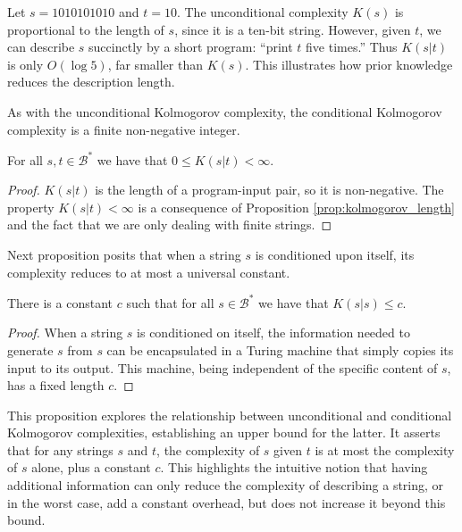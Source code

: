 \begin{example}
Let $s = 1010101010$ and $t = 10$. The unconditional complexity $K(s)$ is proportional to the length of $s$, since it is a ten-bit string. However, given $t$, we can describe $s$ succinctly by a short program: ``print $t$ five times.'' Thus $K(s|t)$ is only $O(\log 5)$, far smaller than $K(s)$. This illustrates how prior knowledge reduces the description length.
\end{example}

As with the unconditional Kolmogorov complexity, the conditional Kolmogorov complexity is a finite non-negative integer.

\begin{proposition}
For all $s, t \in\mathcal{B}^{\ast}$ we have that $0 \leq K(s | t) < \infty$.
\end{proposition}
\begin{proof}
$K(s|t)$ is the length of a program-input pair, so it is non-negative. The property $K(s | t) < \infty$ is a consequence of Proposition \ref{prop:kolmogorov_length} and the fact that we are only dealing with finite strings.
\end{proof}

Next proposition posits that when a string $s$ is conditioned upon itself, its complexity reduces to at most a universal constant.

\begin{proposition}
\label{prop:self_conditional}
There is a constant $c$ such that for all $s\in\mathcal{B}^{\ast}$ we have that $K(s | s ) \leq c$.
\end{proposition}
\begin{proof}
When a string $s$ is conditioned on itself, the information needed to generate $s$ from $s$ can be encapsulated in a Turing machine that simply copies its input to its output. This machine, being independent of the specific content of $s$, has a fixed length $c$. 
\end{proof}

This proposition explores the relationship between unconditional and conditional Kolmogorov complexities, establishing an upper bound for the latter. It asserts that for any strings $s$ and $t$, the complexity of $s$ given $t$ is at most the complexity of $s$ alone, plus a constant $c$. This highlights the intuitive notion that having additional information can only reduce the complexity of describing a string, or in the worst case, add a constant overhead, but does not increase it beyond this bound.

